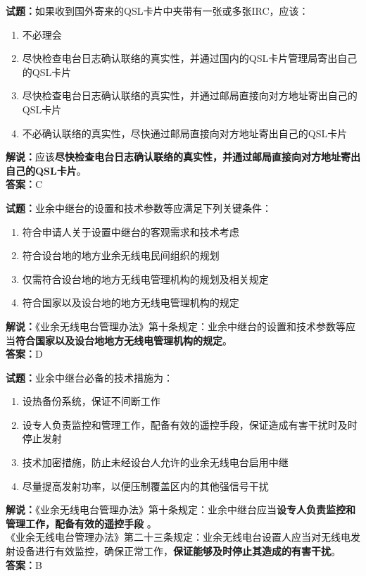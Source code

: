 \documentclass{ctexbook}
\begin{document}
\bigskip

\noindent\textbf{试题：}如果收到国外寄来的QSL卡片中夹带有一张或多张IRC，应该：
\begin{enumerate}[leftmargin=3em]
  \item 不必理会
  \item 尽快检查电台日志确认联络的真实性，并通过国内的QSL卡片管理局寄出自己的QSL卡片
  \item 尽快检查电台日志确认联络的真实性，并通过邮局直接向对方地址寄出自己的QSL卡片
  \item 不必确认联络的真实性，尽快通过邮局直接向对方地址寄出自己的QSL卡片
\end{enumerate}
\noindent\textbf{解说：}应该\textbf{尽快检查电台日志确认联络的真实性，并通过邮局直接向对方地址寄出自己的QSL卡片}。\\\noindent\textbf{答案：}C

\bigskip

\noindent\textbf{试题：}业余中继台的设置和技术参数等应满足下列关键条件：
\begin{enumerate}[leftmargin=3em]
  \item 符合申请人关于设置中继台的客观需求和技术考虑
  \item 符合设台地的地方业余无线电民间组织的规划
  \item 仅需符合设台地的地方无线电管理机构的规划及相关规定
  \item 符合国家以及设台地的地方无线电管理机构的规定
\end{enumerate}
\noindent\textbf{解说：}《业余无线电台管理办法》第十条规定：业余中继台的设置和技术参数等应当\textbf{符合国家以及设台地地方无线电管理机构的规定}。\\\noindent\textbf{答案：}D

\bigskip

\noindent\textbf{试题：}业余中继台必备的技术措施为：
\begin{enumerate}[leftmargin=3em]
  \item 设热备份系统，保证不间断工作
  \item 设专人负责监控和管理工作，配备有效的遥控手段，保证造成有害干扰时及时停止发射
  \item 技术加密措施，防止未经设台人允许的业余无线电台启用中继
  \item 尽量提高发射功率，以便压制覆盖区内的其他强信号干扰
\end{enumerate}
\noindent\textbf{解说：}《业余无线电台管理办法》第十条规定：业余中继台应当\textbf{设专人负责监控和管理工作，配备有效的遥控手段 }。\\
《业余无线电台管理办法》第二十三条规定：业余无线电台设置人应当对无线电发射设备进行有效监控，确保正常工作，\textbf{保证能够及时停止其造成的有害干扰}。 \\\noindent\textbf{答案：}B
\end{document}
